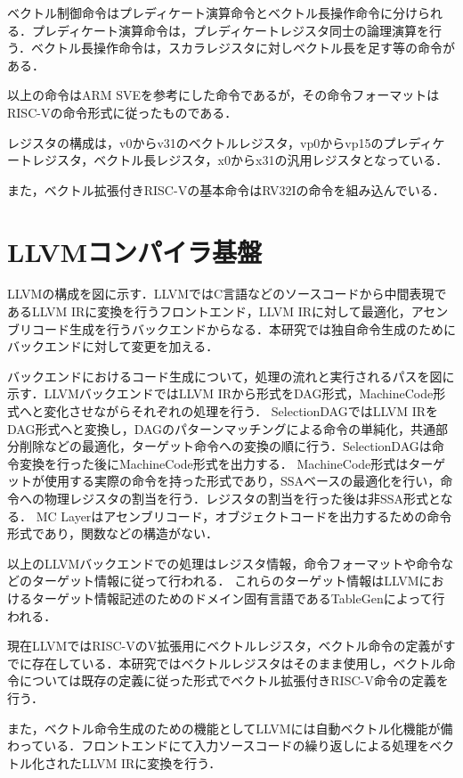 \documentclass[a4paper,9pt, twocolumn]{jarticle}
\begin{document}
ベクトル制御命令はプレディケート演算命令とベクトル長操作命令に分けられる．プレディケート演算命令は，プレディケートレジスタ同士の論理演算を行う．ベクトル長操作命令は，スカラレジスタに対しベクトル長を足す等の命令がある．

以上の命令はARM SVEを参考にした命令であるが，その命令フォーマットはRISC-Vの命令形式に従ったものである．

レジスタの構成は，v0からv31のベクトルレジスタ，vp0からvp15のプレディケートレジスタ，ベクトル長レジスタ，x0からx31の汎用レジスタとなっている．

また，ベクトル拡張付きRISC-Vの基本命令はRV32Iの命令を組み込んでいる．

\section{LLVMコンパイラ基盤}
LLVMの構成を図に示す．LLVMではC言語などのソースコードから中間表現であるLLVM IRに変換を行うフロントエンド，LLVM IRに対して最適化，アセンブリコード生成を行うバックエンドからなる．本研究では独自命令生成のためにバックエンドに対して変更を加える．

バックエンドにおけるコード生成について，処理の流れと実行されるパスを図に示す．LLVMバックエンドではLLVM IRから形式をDAG形式，MachineCode形式へと変化させながらそれぞれの処理を行う．
SelectionDAGではLLVM IRをDAG形式へと変換し，DAGのパターンマッチングによる命令の単純化，共通部分削除などの最適化，ターゲット命令への変換の順に行う．SelectionDAGは命令変換を行った後にMachineCode形式を出力する．
MachineCode形式はターゲットが使用する実際の命令を持った形式であり，SSAベースの最適化を行い，命令への物理レジスタの割当を行う．レジスタの割当を行った後は非SSA形式となる．
MC Layerはアセンブリコード，オブジェクトコードを出力するための命令形式であり，関数などの構造がない．

以上のLLVMバックエンドでの処理はレジスタ情報，命令フォーマットや命令などのターゲット情報に従って行われる．
これらのターゲット情報はLLVMにおけるターゲット情報記述のためのドメイン固有言語であるTableGenによって行われる．

現在LLVMではRISC-VのV拡張用にベクトルレジスタ，ベクトル命令の定義がすでに存在している．本研究ではベクトルレジスタはそのまま使用し，ベクトル命令については既存の定義に従った形式でベクトル拡張付きRISC-V命令の定義を行う．

また，ベクトル命令生成のための機能としてLLVMには自動ベクトル化機能が備わっている．フロントエンドにて入力ソースコードの繰り返しによる処理をベクトル化されたLLVM IRに変換を行う．
\end{document}
